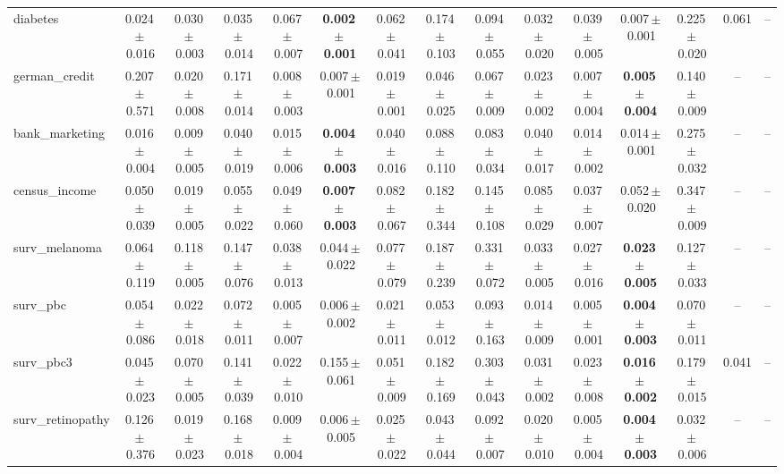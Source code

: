 \documentclass[8pt]{extarticle}
\begin{document}
\begin{longtable}{l*{14}{c}}
diabetes & 0.024\,$\pm$\,0.016 & 0.030\,$\pm$\,0.003 & 0.035\,$\pm$\,0.014 & 0.067\,$\pm$\,0.007 & \textbf{0.002\,$\pm$\,0.001} & 0.062\,$\pm$\,0.041 & 0.174\,$\pm$\,0.103 & 0.094\,$\pm$\,0.055 & 0.032\,$\pm$\,0.020 & 0.039\,$\pm$\,0.005 & 0.007\,$\pm$\,0.001 & 0.225\,$\pm$\,0.020 & 0.061 & -- \\
german\_credit & 0.207\,$\pm$\,0.571 & 0.020\,$\pm$\,0.008 & 0.171\,$\pm$\,0.014 & 0.008\,$\pm$\,0.003 & 0.007\,$\pm$\,0.001 & 0.019\,$\pm$\,0.001 & 0.046\,$\pm$\,0.025 & 0.067\,$\pm$\,0.009 & 0.023\,$\pm$\,0.002 & 0.007\,$\pm$\,0.004 & \textbf{0.005\,$\pm$\,0.004} & 0.140\,$\pm$\,0.009 & -- & -- \\
bank\_marketing & 0.016\,$\pm$\,0.004 & 0.009\,$\pm$\,0.005 & 0.040\,$\pm$\,0.019 & 0.015\,$\pm$\,0.006 & \textbf{0.004\,$\pm$\,0.003} & 0.040\,$\pm$\,0.016 & 0.088\,$\pm$\,0.110 & 0.083\,$\pm$\,0.034 & 0.040\,$\pm$\,0.017 & 0.014\,$\pm$\,0.002 & 0.014\,$\pm$\,0.001 & 0.275\,$\pm$\,0.032 & -- & -- \\
census\_income & 0.050\,$\pm$\,0.039 & 0.019\,$\pm$\,0.005 & 0.055\,$\pm$\,0.022 & 0.049\,$\pm$\,0.060 & \textbf{0.007\,$\pm$\,0.003} & 0.082\,$\pm$\,0.067 & 0.182\,$\pm$\,0.344 & 0.145\,$\pm$\,0.108 & 0.085\,$\pm$\,0.029 & 0.037\,$\pm$\,0.007 & 0.052\,$\pm$\,0.020 & 0.347\,$\pm$\,0.009 & -- & -- \\
surv\_melanoma & 0.064\,$\pm$\,0.119 & 0.118\,$\pm$\,0.005 & 0.147\,$\pm$\,0.076 & 0.038\,$\pm$\,0.013 & 0.044\,$\pm$\,0.022 & 0.077\,$\pm$\,0.079 & 0.187\,$\pm$\,0.239 & 0.331\,$\pm$\,0.072 & 0.033\,$\pm$\,0.005 & 0.027\,$\pm$\,0.016 & \textbf{0.023\,$\pm$\,0.005} & 0.127\,$\pm$\,0.033 & -- & -- \\
surv\_pbc & 0.054\,$\pm$\,0.086 & 0.022\,$\pm$\,0.018 & 0.072\,$\pm$\,0.011 & 0.005\,$\pm$\,0.007 & 0.006\,$\pm$\,0.002 & 0.021\,$\pm$\,0.011 & 0.053\,$\pm$\,0.012 & 0.093\,$\pm$\,0.163 & 0.014\,$\pm$\,0.009 & 0.005\,$\pm$\,0.001 & \textbf{0.004\,$\pm$\,0.003} & 0.070\,$\pm$\,0.011 & -- & -- \\
surv\_pbc3 & 0.045\,$\pm$\,0.023 & 0.070\,$\pm$\,0.005 & 0.141\,$\pm$\,0.039 & 0.022\,$\pm$\,0.010 & 0.155\,$\pm$\,0.061 & 0.051\,$\pm$\,0.009 & 0.182\,$\pm$\,0.169 & 0.303\,$\pm$\,0.043 & 0.031\,$\pm$\,0.002 & 0.023\,$\pm$\,0.008 & \textbf{0.016\,$\pm$\,0.002} & 0.179\,$\pm$\,0.015 & 0.041 & -- \\
surv\_retinopathy & 0.126\,$\pm$\,0.376 & 0.019\,$\pm$\,0.023 & 0.168\,$\pm$\,0.018 & 0.009\,$\pm$\,0.004 & 0.006\,$\pm$\,0.005 & 0.025\,$\pm$\,0.022 & 0.043\,$\pm$\,0.044 & 0.092\,$\pm$\,0.007 & 0.020\,$\pm$\,0.010 & 0.005\,$\pm$\,0.004 & \textbf{0.004\,$\pm$\,0.003} & 0.032\,$\pm$\,0.006 & -- & -- \\

\end{longtable}
\end{document}
